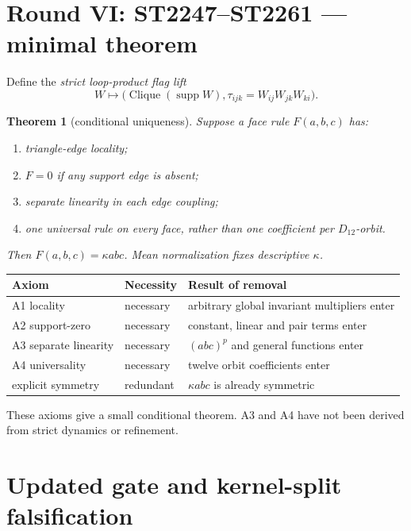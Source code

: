 \documentclass[11pt,a4paper]{article}
\newtheorem{theorem}{Theorem}
\begin{document}
\section{Round VI: ST2247--ST2261 --- minimal theorem}

Define the \emph{strict loop-product flag lift}
\[
 W\longmapsto
 \bigl(\operatorname{Clique}(\operatorname{supp}W),
       \tau_{ijk}=W_{ij}W_{jk}W_{ki}\bigr).
\]

\begin{theorem}[conditional uniqueness]
Suppose a face rule \(F(a,b,c)\) has:
\begin{enumerate}[label=\textnormal{\bfseries A\arabic*.}]
\item triangle-edge locality;
\item \(F=0\) if any support edge is absent;
\item separate linearity in each edge coupling;
\item one universal rule on every face, rather than one coefficient per
      \(D_{12}\)-orbit.
\end{enumerate}
Then \(F(a,b,c)=\kappa abc\).  Mean normalization fixes descriptive
\(\kappa\).
\end{theorem}

\begin{longtable}{@{}p{}p{}p{}@{}}
\toprule
Axiom & Necessity & Result of removal \\
\midrule\endhead
A1 locality & necessary & arbitrary global invariant multipliers enter \\
A2 support-zero & necessary & constant, linear and pair terms enter \\
A3 separate linearity & necessary & \((abc)^p\) and general functions enter \\
A4 universality & necessary & twelve orbit coefficients enter \\
explicit symmetry & redundant & \(\kappa abc\) is already symmetric \\
\bottomrule
\end{longtable}

These axioms give a small conditional theorem.  A3 and A4 have not been
derived from strict dynamics or refinement.

\section{Updated gate and kernel-split falsification}
\end{document}
